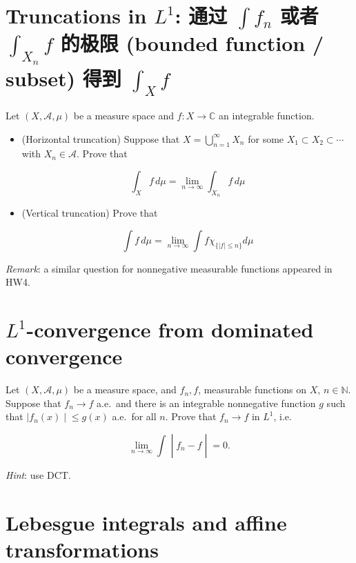\section{\texorpdfstring{Truncations in \(L^{1}\): 通过 \(\int f_{n}\) 或者 \(\int_{X_{n}}f\) 的极限 (bounded function / subset) 得到 \(\int_{X}f\)}{Truncations in L\^{}\{1\}: 通过 \textbackslash int f\_\{n\} 或者 \textbackslash int\_\{X\_\{n\}\}f 的极限 (bounded function / subset) 得到 \textbackslash int\_\{X\}f}}\label{truncations-in-l1-ux901aux8fc7-int-f_n-ux6216ux8005-int_x_n-f-ux7684ux6781ux9650-bounded-function-subset-ux5f97ux5230-int_x-f}

Let \((X,\mathcal{A},\mu)\) be a measure space and \(f:X\rightarrow\mathbb{C}\) an integrable function.

\begin{itemize}
\item
  (Horizontal truncation) Suppose that \(X = \bigcup_{n = 1}^{\infty}X_{n}\) for some \(X_{1} \subset X_{2} \subset \cdots\) with \(X_{n} \in \mathcal{A}\). Prove that

  \[\int_{X}f\, d\mu = \lim\limits_{n\rightarrow\infty}\int_{X_{n}}f\, d\mu\]
\item
  (Vertical truncation) Prove that

  \[\int f\, d\mu = \lim\limits_{n\rightarrow\infty}\int f\chi_{\{{|f| \leq n}\}} d\mu\]
\end{itemize}

\emph{Remark}: a similar question for nonnegative measurable functions appeared in HW4.

\section{\texorpdfstring{\(L^{1}\)-convergence from dominated convergence}{L\^{}\{1\}-convergence from dominated convergence}}\label{l1-convergence-from-dominated-convergence}

Let \((X,\mathcal{A},\mu)\) be a measure space, and \(f_{n},f\), measurable functions on \(X\), \(n \in \mathbb{N}\). Suppose that \(f_{n}\rightarrow f\) a.e.~and there is an integrable nonnegative function \(g\) such that \(\left. |f_{n}(x) \middle| \leq g(x) \right.\) a.e.~for all \(n\). Prove that \(f_{n}\rightarrow f\) in \(L^{1}\), i.e.~

\[\left. \lim\limits_{n\rightarrow\infty}\int \middle| f_{n} - f \middle| = 0. \right.\]

\emph{Hint}: use DCT.

\section{Lebesgue integrals and affine transformations}\label{lebesgue-integrals-and-affine-transformations}

